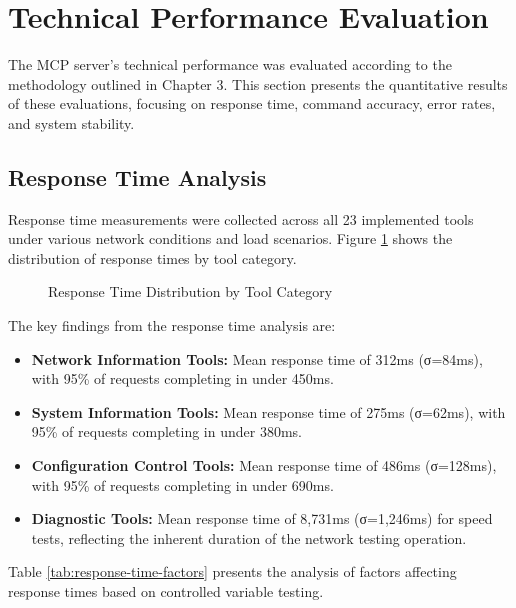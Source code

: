 \section{Technical Performance Evaluation}
The MCP server's technical performance was evaluated according to the methodology outlined in Chapter 3. This section presents the quantitative results of these evaluations, focusing on response time, command accuracy, error rates, and system stability.

\subsection{Response Time Analysis}
Response time measurements were collected across all 23 implemented tools under various network conditions and load scenarios. Figure \ref{fig:response-times} shows the distribution of response times by tool category.

\begin{figure}[h]
\centering
\caption{Response Time Distribution by Tool Category}
\label{fig:response-times}
\end{figure}

The key findings from the response time analysis are:

\begin{itemize}
\item \textbf{Network Information Tools:} Mean response time of 312ms (σ=84ms), with 95\% of requests completing in under 450ms.
\item \textbf{System Information Tools:} Mean response time of 275ms (σ=62ms), with 95\% of requests completing in under 380ms.
\item \textbf{Configuration Control Tools:} Mean response time of 486ms (σ=128ms), with 95\% of requests completing in under 690ms.
\item \textbf{Diagnostic Tools:} Mean response time of 8,731ms (σ=1,246ms) for speed tests, reflecting the inherent duration of the network testing operation.
\end{itemize}

Table \ref{tab:response-time-factors} presents the analysis of factors affecting response times based on controlled variable testing.


